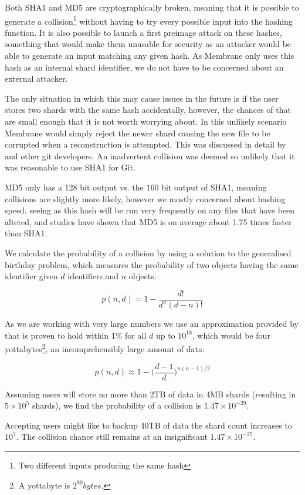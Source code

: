 \documentclass[11pt, a4paper, twoside]{report}
\begin{document}
Both SHA1 \citep{wang2005collision} and MD5 \citep{stevens2006fast} are cryptographically broken, meaning that it is possible to generate a collision\footnote{Two different inputs producing the same hash} without having to try every possible input into the hashing function. It is also possible to launch a first preimage attack on these hashes, something that would make them unusable for security as an attacker would be able to generate an input matching any given hash. As Membrane only uses this hash as an internal shard identifier, we do not have to be concerned about an external attacker.

The only situation in which this may cause issues in the future is if the user stores two shards with the same hash accidentally, however, the chances of that are small enough that it is not worth worrying about. In this unlikely scenario Membrane would simply reject the newer shard causing the new file to be corrupted when a reconstruction is attempted. This was discussed in detail by \cite{torvalds2006gitcollisions} and other git developers. An inadvertent collision was deemed so unlikely that it was reasonable to use SHA1 for Git.

MD5 only has a 128 bit output vs. the 160 bit output of SHA1, meaning collisions are slightly more likely, however we mostly concerned about hashing speed, seeing as this hash will be run very frequently on any files that have been altered, and studies have shown that MD5 is on average about 1.75 times faster than SHA1. \citep{saphir2007securite}

We calculate the probability of a collision by using a solution to the generalised birthday problem, which measures the probability of two objects having the same identifier given $d$ identifiers and $n$ objects.

$$p(n, d) = 1 - \frac{d!}{d^{n}(d - n)!}$$

As we are working with very large numbers we use an approximation provided by \cite{brink2012probably} that is proven to hold within 1\% for all $d$ up to $10^{18}$, which would be four yottabytes\footnote{A yottabyte is $2^{80} bytes.$}, an incomprehensibly large amount of data:

$$p(n, d) \approx 1 - \bigg(\frac{d-1}{d}\bigg)^{n(n-1)/2}$$

Assuming users will store no more than 2TB of data in 4MB shards (resulting in $5 \times 10^5$ shards), we find the probability of a collision is $1.47 \times 10^{-29}$.

Accepting users might like to backup 40TB of data the shard count increases to $10^{7}$. The collision chance still remains at an insignificant $1.47 \times 10^{-25}$.
\end{document}
